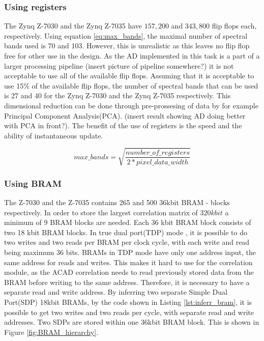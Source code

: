 \subsubsection{Using registers}
The Zynq Z-7030 and the Zynq Z-7035 have $157,200$ and $343,800$ flip flops each, respectively. Using equation \ref{eq:max_bands}, the maximal number of spectral bands used is 70 and 103. However, this is unrealistic as this leaves no flip flop free for other use in the design. As the AD implemented in this task is a part of a larger processing pipeline (insert picture of pipeline somewhere?) it is not acceptable to use all of the available flip flops. Assuming that it is acceptable to use 15\% of the available flip flops, the number of spectral bands that can be used is 27 and 40 for the Zynq Z-7030 and the Zynq Z-7035 respectively. This dimensional reduction can be done through pre-prossesing of data by for example Principal Component Analysis(PCA). (insert result showing AD doing better with PCA in front?). 
The benefit of the use of registers is the speed and the ability of instantaneous update. %

\begin{equation}
    max\_bands= \sqrt{\frac{number\_of\_registers}{2*pixel\_data\_width}}
    \label{eq:max_bands}
\end{equation}

\subsubsection{Using BRAM}
The Z-7030 and the Z-7035 contains 265 and 500 $36$kbit BRAM - blocks respectively. In  order to store the largest correlation matrix of $320 kbit$ a minimum of 9 BRAM blocks are needed. Each 36 kbit BRAM block consists of two 18 kbit BRAM blocks. In true dual port(TDP) mode \cite{cite:ug953}, it is possible to do two writes and two reads per BRAM per clock cycle, with each write and read being maximum 36 bits. BRAMs in TDP mode have only one address input, the same address for reads and writes. This makes it hard to use for the correlation module, as the ACAD correlation needs to read previously stored data from the BRAM before writing to the same address. Therefore, it is necessary to have a separate read and write address. By inferring two separate Simple Dual Port(SDP) 18kbit BRAMs, by the code shown in Listing \ref{lst:inferr_bram}, it is possible to get two writes and two reads per cycle, with separate read and write addresses. Two SDPs are stored within one 36kbit BRAM block. This is shown in Figure \ref{fig:BRAM_hierarchy}.

